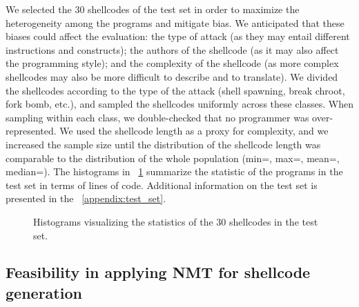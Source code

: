 We selected the 30 shellcodes of the test set in order to maximize the heterogeneity among the programs and mitigate bias. We anticipated that these biases could affect the evaluation: the type of attack (as they may entail different instructions and constructs); the authors of the shellcode (as it may also affect the programming style); and the complexity of the shellcode (as more complex shellcodes may also be more difficult to describe and to translate). We divided the shellcodes according to the type of the attack (shell spawning, break chroot, fork bomb, etc.), and sampled the shellcodes uniformly across these classes. When sampling within each class, we double-checked that no programmer was over-represented. We used the shellcode length as a proxy for complexity, and we increased the sample size until the distribution of the shellcode length was comparable to the distribution of the whole population (min=, max=, mean=, median=).
The histograms in \figurename{}~\ref{fig:test_statistic} summarize the statistic of the programs in the test set in terms of lines of code.
Additional information on the test set is presented in the \appendixname~\ref{appendix:test_set}. 

 \begin{figure}[ht]
    \centering
    \hfill
    \caption{Histograms visualizing the statistics of the  30 shellcodes in the test set.}
    \label{fig:test_statistic}
     
\end{figure}

 











\subsection{Feasibility in applying NMT for shellcode generation}
\label{subsec:RQ1}



